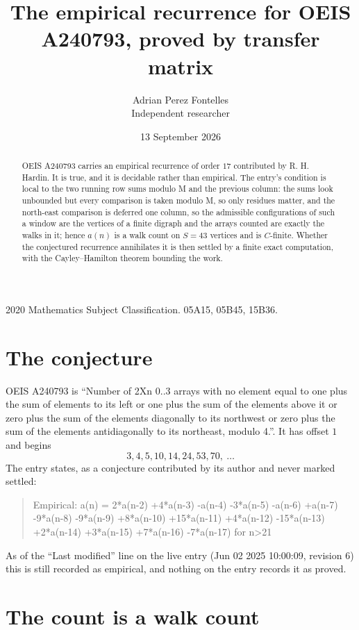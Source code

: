 \documentclass[11pt,a4paper]{article}
\title{The empirical recurrence for OEIS A240793, proved by transfer matrix}
\author{Adrian Perez Fontelles\\ \small Independent researcher}
\date{13 September 2026}
\theoremstyle{plain}
\theoremstyle{definition}
\begin{document}
\maketitle

\begin{abstract}
OEIS A240793 carries an empirical recurrence of order $17$ contributed by R. H. Hardin. It is
true, and it is decidable rather than empirical. The entry's condition is local to the two running row sums modulo M and the previous column: the sums look unbounded but every comparison is taken modulo M, so only residues matter, and the north-east comparison is deferred one column, so
the admissible configurations of such a window are the vertices of a finite digraph and the
arrays counted are exactly the walks in it; hence $a(n)$ is a walk count on $S=43$ vertices
and is $C$-finite. Whether the conjectured recurrence annihilates it is then settled by a
finite exact computation, with the Cayley--Hamilton theorem bounding the work.
\end{abstract}

\noindent\small 2020 Mathematics Subject Classification. 05A15, 05B45, 15B36.\normalsize

\section{The conjecture}

OEIS A240793 is ``Number of 2Xn 0..3 arrays with no element equal to one plus the sum of elements to its left or one plus the sum of the elements above it or zero plus the sum of the elements diagonally to its northwest or zero plus the sum of the elements antidiagonally to its northeast, modulo 4.''. It has offset $1$ and begins
\[
3, 4, 5, 10, 14, 24, 53, 70,\ \dots
\]
The entry states, as a conjecture contributed by its author and never marked settled:
\begin{quote}
Empirical: a(n) = 2*a(n-2) +4*a(n-3) -a(n-4) -3*a(n-5) -a(n-6) +a(n-7) -9*a(n-8) -9*a(n-9) +8*a(n-10) +15*a(n-11) +4*a(n-12) -15*a(n-13) +2*a(n-14) +3*a(n-15) +7*a(n-16) -7*a(n-17) for n>21
\end{quote}
As of the ``Last modified'' line on the live entry (Jun 02 2025 10:00:09, revision 6) this is still
recorded as empirical, and nothing on the entry records it as proved.

\section{The count is a walk count}
\end{document}
